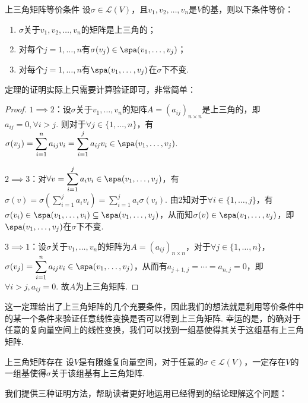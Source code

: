 \begin{theorem}{}{上三角矩阵等价条件}
    设$\sigma\in \mathcal{L}(V)$，且$v_1,v_2,\ldots,v_n$是$V$的基，则以下条件等价：
    \begin{enumerate}
        \item $\sigma$关于$v_1,v_2,\ldots,v_n$的矩阵是上三角的；

        \item 对每个$j=1,\ldots,n$有$\sigma(v_j)\in\spa(v_1,\ldots,v_j)$；

        \item 对每个$j=1,\ldots,n$有$\spa(v_1,\ldots,v_j)$在$\sigma$下不变.
    \end{enumerate}
\end{theorem}
定理的证明实际上只需要计算验证即可，非常简单：
\begin{proof}
$1 \implies 2$：设$\sigma$关于$v_1,\ldots,v_n$的矩阵$A=(a_{ij})_{n\times n}$是上三角的，即$a_{ij}=0,\forall i>j$. 则对于$\forall j \in \{1,\ldots,n\}$，有$\sigma(v_j)=\displaystyle\sum_{i=1}^{n}a_{ij}v_i=\displaystyle\sum_{i=1}^{j}a_{ij}v_i\in  \spa(v_1,\ldots,v_j)$.

$2 \implies 3$：对$\forall v=\displaystyle\sum_{i=1}^{j}a_iv_i \in \spa(v_1,\ldots,v_j)$，有$\sigma(v)=\sigma(\displaystyle\sum_{i=1}^{j}a_iv_i)=\displaystyle\sum_{i=1}^{j}a_i\sigma(v_i)$.
由2知对于$\forall i \in \{1,\ldots,j\}$，有$\sigma(v_i) \in \spa(v_1,\ldots,v_i) \subseteq \spa(v_1,\ldots,v_j)$，从而知$\sigma(v) \in \spa(v_1,\ldots,v_j)$，即$\spa(v_1,\ldots,v_j)$在$\sigma$下不变.

$3 \implies 1$：设$\sigma$关于$v_1,\ldots,v_n$的矩阵为$A=(a_{ij})_{n\times n}$，对于$\forall j \in \{1,\ldots,n\}$，$\sigma(v_j)=\displaystyle\sum_{i=1}^{n}a_{ij}v_i\in \spa(v_1,\ldots,v_j)$，从而有$a_{j+1,j}=\cdots=a_{n,j}=0$，即$\forall i>j,a_{ij}=0$. 故$A$为上三角矩阵.
\end{proof}

这一定理给出了上三角矩阵的几个充要条件，因此我们的想法就是利用等价条件中的某一个条件来验证任意线性变换是否可以得到上三角矩阵. 幸运的是，的确对于任意的复向量空间上的线性变换，我们可以找到一组基使得其关于这组基有上三角矩阵.
\begin{theorem}{}{上三角矩阵存在}
    设$V$是有限维复向量空间，对于任意的$\sigma\in \mathcal{L}(V)$，一定存在$V$的一组基使得$\sigma$关于该组基有上三角矩阵.
\end{theorem}

我们提供三种证明方法，帮助读者更好地运用已经得到的结论理解这个问题：

